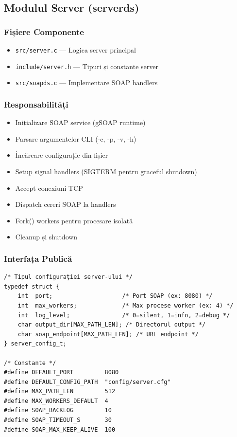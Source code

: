 \documentclass[12pt,a4paper,twoside]{article}
\begin{document}
\subsection{Modulul Server (serverds)}

\subsubsection{Fișiere Componente}
\begin{itemize}
    \item \texttt{src/server.c} --- Logica server principal
    \item \texttt{include/server.h} --- Tipuri și constante server
    \item \texttt{src/soapds.c} --- Implementare SOAP handlers
\end{itemize}

\subsubsection{Responsabilități}

\begin{itemize}
    \item Inițializare SOAP service (gSOAP runtime)
    \item Parsare argumentelor CLI (-c, -p, -v, -h)
    \item Încărcare configurație din fișier
    \item Setup signal handlers (SIGTERM pentru graceful shutdown)
    \item Accept conexiuni TCP
    \item Dispatch cereri SOAP la handlers
    \item Fork() workers pentru procesare isolată
    \item Cleanup și shutdown
\end{itemize}

\subsubsection{Interfața Publică}

\begin{lstlisting}
/* Tipul configurației server-ului */
typedef struct {
    int  port;                    /* Port SOAP (ex: 8080) */
    int  max_workers;             /* Max procese worker (ex: 4) */
    int  log_level;               /* 0=silent, 1=info, 2=debug */
    char output_dir[MAX_PATH_LEN]; /* Directorul output */
    char soap_endpoint[MAX_PATH_LEN]; /* URL endpoint */
} server_config_t;

/* Constante */
#define DEFAULT_PORT         8080
#define DEFAULT_CONFIG_PATH  "config/server.cfg"
#define MAX_PATH_LEN         512
#define MAX_WORKERS_DEFAULT  4
#define SOAP_BACKLOG         10
#define SOAP_TIMEOUT_S       30
#define SOAP_MAX_KEEP_ALIVE  100
\end{lstlisting}
\end{document}
